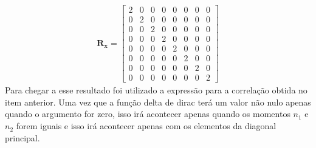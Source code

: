 \begin{align}
    \mathbf{R}_{\mathbf{x}} = \left[
    \begin{matrix}
        2 & 0 & 0 & 0 & 0 & 0 & 0 & 0\\
        0 & 2 & 0 & 0 & 0 & 0 & 0 & 0\\
        0 & 0 & 2 & 0 & 0 & 0 & 0 & 0\\
        0 & 0 & 0 & 2 & 0 & 0 & 0 & 0\\
        0 & 0 & 0 & 0 & 2 & 0 & 0 & 0\\
        0 & 0 & 0 & 0 & 0 & 2 & 0 & 0\\
        0 & 0 & 0 & 0 & 0 & 0 & 2 & 0\\
        0 & 0 & 0 & 0 & 0 & 0 & 0 & 2
    \end{matrix}
    \right]
\end{align}
Para chegar a esse resultado foi utilizado a expressão para a correlação obtida no item anterior. Uma vez que a função delta de dirac terá um valor não nulo apenas quando o argumento for zero, isso irá acontecer apenas quando os momentos $n_{1}$ e $n_{2}$ forem iguais e isso irá acontecer apenas com os elementos da diagonal principal.

